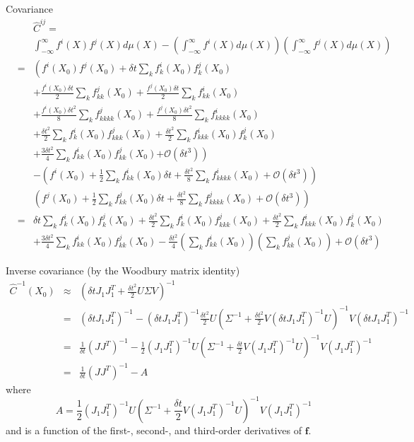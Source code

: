 \documentclass[12pt]{article}
\begin{document}
Covariance
\begin{eqnarray}
&& \hat{C}^{ij} = \\ 
&& \int_{-\infty}^{\infty} f^i(X) f^j(X) d\mu(X) - \left(\int_{-\infty}^{\infty} f^i(X) d\mu(X) \right) \left(\int_{-\infty}^{\infty} f^j(X) d\mu(X) \right) \\
&=& \left( f^i(X_0) f^j(X_0) 
 + \delta t \sum_k f^i_k(X_0)  f^j_k(X_0) \right.   \\
&&  + \frac{f^i(X_0) \delta t}{2} \sum_{k} f^j_{kk}(X_0)
+ \frac{f^j(X_0) \delta t}{2} \sum_{k} f^i_{kk}(X_0)  \\
&&+ \frac{f^i(X_0) \delta t^2}{8} \sum_{k} f^j_{kkkk} (X_0) 
+ \frac{f^j(X_0) \delta t^2}{8} \sum_{k} f^i_{kkkk} (X_0)\\
&& + \frac{\delta t^2}{2} \sum_k f^i_k(X_0) f^j_{kkk} (X_0)  
 + \frac{\delta t^2}{2} \sum_k f^i_{kkk} (X_0) f^j_k(X_0) \\
&&+  \frac{3  \delta t^2}{4} \sum_{k} f^i_{kk}(X_0) f^j_{kk}(X_0) 
 \left.+ \mathcal{O}\left( \delta t^3 \right) \right) \\
&&- \left( f^i(X_0) + \frac{1}{2} \sum_k f^i_{kk}(X_0) \delta t + \frac{\delta t^2}{8} \sum_{k} f^i_{kkkk} (X_0) + \mathcal{O} (\delta t^3 ) \right) \\
&&\left( f^j(X_0) + \frac{1}{2} \sum_k f^j_{kk}(X_0) \delta t + \frac{\delta t^2}{8} \sum_{k} f^j_{kkkk} (X_0) + \mathcal{O} (\delta t^3 ) \right) \\
&=&
\delta t \sum_k f^i_k(X_0)  f^j_k(X_0) 
+ \frac{\delta t^2}{2} \sum_k f^i_k(X_0) f^j_{kkk} (X_0)  
 + \frac{\delta t^2}{2} \sum_k f^i_{kkk} (X_0) f^j_k(X_0) \\
&&+  \frac{3 \delta t^2}{4} \sum_{k} f^i_{kk}(X_0) f^j_{kk}(X_0) 
- \frac{\delta t^2}{4} \left( \sum_k f^i_{kk}(X_0) \right) \left( \sum_k f^j_{kk}(X_0) \right) 
 + \mathcal{O}\left( \delta t^3 \right) 
\end{eqnarray}

Inverse covariance (by the Woodbury matrix identity)
\begin{eqnarray}
\hat{C}^{-1}(X_0) &\approx & 
\left( \delta t J_1 J_1^T + \frac{\delta t^2}{2}  U \Sigma V \right)^{-1} \\
&=& \left( \delta t J_1 J_1^T \right)^{-1} - 
\left( \delta t J_1 J_1^T \right)^{-1} \frac{\delta t^2}{2} U \left(\Sigma^{-1} + \frac{\delta t^2}{2} V \left( \delta t J_1 J_1^T \right)^{-1} U \right)^{-1} V \left( \delta t J_1 J_1^T \right)^{-1} \\
&=& \frac{1}{\delta t} \left( J J^T \right)^{-1}
- \frac{1}{2} (J_1 J_1^T)^{-1} U \left(\Sigma^{-1} + \frac{\delta t}{2} V \left( J_1 J_1^T \right)^{-1} U \right)^{-1} V \left( J_1 J_1^T \right)^{-1}  \\
&=& \frac{1}{\delta t} \left( J J^T \right)^{-1} - A
\end{eqnarray}
%
where 
\begin{equation}
A = \frac{1}{2} (J_1 J_1^T)^{-1} U \left(\Sigma^{-1} + \frac{\delta t}{2} V \left( J_1 J_1^T \right)^{-1} U \right)^{-1} V \left( J_1 J_1^T \right)^{-1}
\end{equation}
 and is a function of the first-, second-, and third-order derivatives of $\mathbf{f}$.
\end{document}
